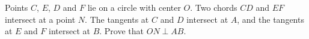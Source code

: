 \documentclass[varwidth]{standalone}
\begin{document}
    Points $C$, $E$, $D$ and $F$ lie on a circle with center $O$. Two chords $CD$ and $EF$ intersect at a point $N$. The tangents at $C$ and $D$ intersect at $A$, and the tangents at $E$ and $F$ intersect at $B$. Prove that $ON \perp AB$.
\end{document}

